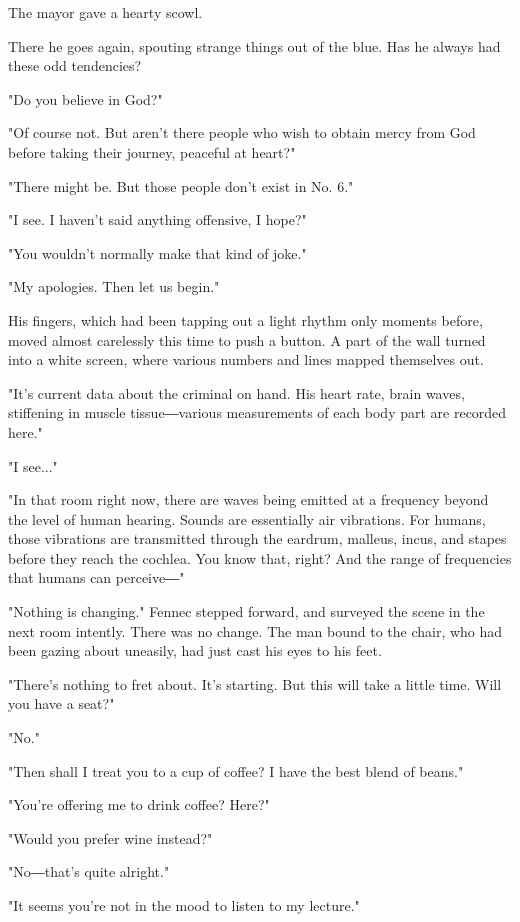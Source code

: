 The mayor gave a hearty scowl.

There he goes again, spouting strange things out of the blue. Has he
always had these odd tendencies?

"Do you believe in God?"

"Of course not. But aren't there people who wish to obtain mercy from
God before taking their journey, peaceful at heart?"

"There might be. But those people don't exist in No. 6."

"I see. I haven't said anything offensive, I hope?"

"You wouldn't normally make that kind of joke."

"My apologies. Then let us begin."

His fingers, which had been tapping out a light rhythm only moments
before, moved almost carelessly this time to push a button. A part of
the wall turned into a white screen, where various numbers and lines
mapped themselves out.

"It's current data about the criminal on hand. His heart rate, brain
waves, stiffening in muscle tissue―various measurements of each body
part are recorded here."

"I see..."

"In that room right now, there are waves being emitted at a frequency
beyond the level of human hearing. Sounds are essentially air
vibrations. For humans, those vibrations are transmitted through the
eardrum, malleus, incus, and stapes before they reach the cochlea. You
know that, right? And the range of frequencies that humans can
perceive―"

"Nothing is changing." Fennec stepped forward, and surveyed the scene in
the next room intently. There was no change. The man bound to the chair,
who had been gazing about uneasily, had just cast his eyes to his feet.

"There's nothing to fret about. It's starting. But this will take a
little time. Will you have a seat?"

"No."

"Then shall I treat you to a cup of coffee? I have the best blend of
beans."

"You're offering me to drink coffee? Here?"

"Would you prefer wine instead?"

"No―that's quite alright."

"It seems you're not in the mood to listen to my lecture."

